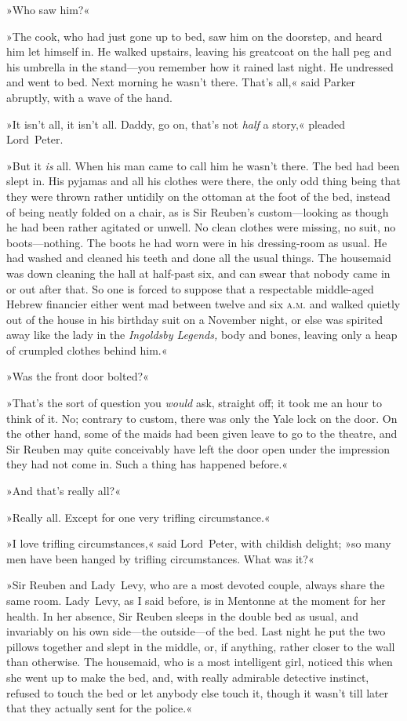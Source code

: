»Who saw him?«

»The cook, who had just gone up to bed, saw him on the doorstep, and heard him let himself in. He walked upstairs, leaving his greatcoat on the hall peg and his umbrella in the stand—you remember how it rained last night. He undressed and went to bed. Next morning he wasn't there. That's all,« said Parker abruptly, with a wave of the hand.

»It isn't all, it isn't all. Daddy, go on, that's not \textit{half} a story,« pleaded Lord~Peter.

»But it \textit{is} all. When his man came to call him he wasn't there. The bed had been slept in. His pyjamas and all his clothes were there, the only odd thing being that they were thrown rather untidily on the ottoman at the foot of the bed, instead of being neatly folded on a chair, as is Sir Reuben's custom—looking as though he had been rather agitated or unwell. No clean clothes were missing, no suit, no boots—nothing. The boots he had worn were in his dressing-room as usual. He had washed and cleaned his teeth and done all the usual things. The housemaid was down cleaning the hall at half-past six, and can swear that nobody came in or out after that. So one is forced to suppose that a respectable middle-aged Hebrew financier either went mad between twelve and six \textsc{a.m.} and walked quietly out of the house in his birthday suit on a November night, or else was spirited away like the lady in the \textit{Ingoldsby Legends,} body and bones, leaving only a heap of crumpled clothes behind him.«

»Was the front door bolted?«

»That's the sort of question you \textit{would} ask, straight off; it took me an hour to think of it. No; contrary to custom, there was only the Yale lock on the door. On the other hand, some of the maids had been given leave to go to the theatre, and Sir Reuben may quite conceivably have left the door open under the impression they had not come in. Such a thing has happened before.«

»And that's really all?«

»Really all. Except for one very trifling circumstance.«

»I love trifling circumstances,« said Lord~Peter, with childish delight; »so many men have been hanged by trifling circumstances. What was it?«

»Sir Reuben and Lady~Levy, who are a most devoted couple, always share the same room. Lady~Levy, as I said before, is in Mentonne at the moment for her health. In her absence, Sir Reuben sleeps in the double bed as usual, and invariably on his own side—the outside—of the bed. Last night he put the two pillows together and slept in the middle, or, if anything, rather closer to the wall than otherwise. The housemaid, who is a most intelligent girl, noticed this when she went up to make the bed, and, with really admirable detective instinct, refused to touch the bed or let anybody else touch it, though it wasn't till later that they actually sent for the police.«

